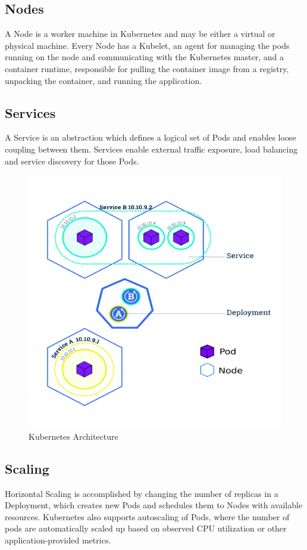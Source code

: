 \documentclass[sigconf]{acmart}
\begin{document}
\subsection{Nodes}
A Node is a worker machine in Kubernetes and may be either a virtual or physical machine. Every Node has a Kubelet, an agent for managing the pods running on the node and communicating with the Kubernetes master, and a container runtime, responsible for pulling the container image from a registry, unpacking the container, and running the application.

\subsection{Services}
A Service is an abstraction which defines a logical set of Pods and enables loose coupling between them. Services enable external traffic exposure, load balancing and service discovery for those Pods.

\begin{figure}[h]
  \centering
  \def\svgwidth{\columnwidth}
%   
  \includegraphics[width=\linewidth]{kube-arch.png}
  \caption{Kubernetes Architecture}
\end{figure}

\subsection{Scaling}
Horizontal Scaling is accomplished by changing the number of replicas in a Deployment, which creates new Pods and schedules them to Nodes with available resources. Kubernetes also supports autoscaling of Pods, where the number of pods are automatically scaled up based on observed CPU utilization or other application-provided metrics.
\end{document}
